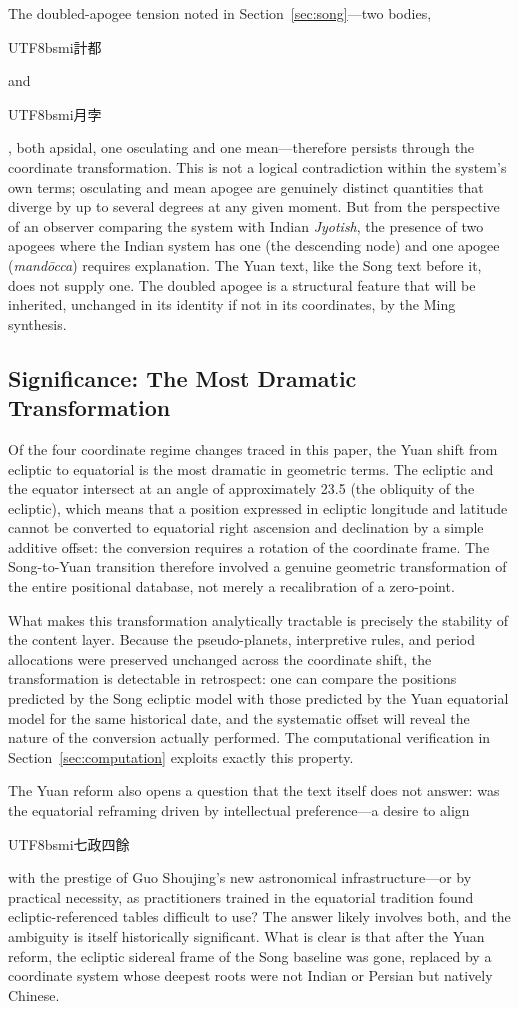 \documentclass[10pt,a4paper]{article}
\newcommand{\zh}[1]{\begin{CJK}{UTF8}{bsmi}#1\end{CJK}}
\begin{document}
The doubled-apogee tension noted in Section~\ref{sec:song}---two
bodies, \zh{計都} and \zh{月孛}, both apsidal, one osculating and
one mean---therefore persists through the coordinate transformation.
This is not a logical contradiction within the system's own terms;
osculating and mean apogee are genuinely distinct quantities that
diverge by up to several degrees at any given moment.  But
from the perspective of an observer comparing the system with
Indian \textit{Jyotish}, the presence of two apogees where the
Indian system has one (the descending node) and one apogee
(\textit{mand\={o}cca}) requires explanation.  The Yuan text,
like the Song text before it, does not supply one.  The doubled
apogee is a structural feature that will be inherited, unchanged
in its identity if not in its coordinates, by the Ming synthesis.

\subsection*{Significance: The Most Dramatic Transformation}

Of the four coordinate regime changes traced in this paper, the
Yuan shift from ecliptic to equatorial is the most dramatic in
geometric terms.  The ecliptic and the equator intersect at an
angle of approximately 23.5\textdegree{} (the obliquity of the
ecliptic), which means that a position expressed in ecliptic
longitude and latitude cannot be converted to equatorial right
ascension and declination by a simple additive offset: the
conversion requires a rotation of the coordinate frame.  The
Song-to-Yuan transition therefore involved a genuine geometric
transformation of the entire positional database, not merely a
recalibration of a zero-point.

What makes this transformation analytically tractable is precisely
the stability of the content layer.  Because the pseudo-planets,
interpretive rules, and period allocations were preserved unchanged
across the coordinate shift, the transformation is detectable in
retrospect: one can compare the positions predicted by the Song
ecliptic model with those predicted by the Yuan equatorial model
for the same historical date, and the systematic offset will reveal
the nature of the conversion actually performed.  The computational
verification in Section~\ref{sec:computation} exploits exactly
this property.

The Yuan reform also opens a question that the text itself does
not answer: was the equatorial reframing driven by intellectual
preference---a desire to align \zh{七政四餘} with the prestige
of Guo Shoujing's new astronomical infrastructure---or by
practical necessity, as practitioners trained in the equatorial
tradition found ecliptic-referenced tables difficult to use?
The answer likely involves both, and the ambiguity is itself
historically significant.  What is clear is that after the Yuan
reform, the ecliptic sidereal frame of the Song baseline was
gone, replaced by a coordinate system whose deepest roots were
not Indian or Persian but natively Chinese.
\end{document}
